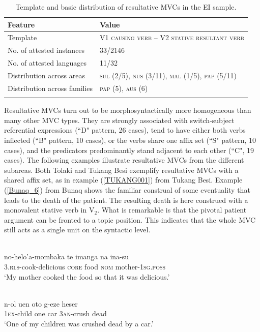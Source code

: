 \begin{table}
\begin{tabular}{ll}
\lsptoprule
Feature&Value\tabularnewline
\hline
Template&V1 \textsc{causing verb} -- V2 \textsc{stative resultant verb}\tabularnewline
No. of attested instances& 33/2146 \tabularnewline
No. of attested languages& 11/32 \tabularnewline
Distribution across areas& \textsc{sul} (2/5), \textsc{nus} (3/11), \textsc{mal} (1/5), \textsc{pap} (5/11) \tabularnewline
Distribution across families& \textsc{pap} (5), \textsc{aus} (6) \tabularnewline
\lspbottomrule
\end{tabular}
\caption[Template and basic distribution of resultative MVCs]{Template and basic distribution of resultative MVCs in the EI sample. }
\label{table:resultative}
\end{table}

Resultative MVCs turn out to be morphosyntactically more homogeneous than many other MVC types. They are strongly associated with switch-subject referential expressions (``D" pattern, 26 cases), tend to have either both verbs inflected (``B" pattern, 10 cases), or the verbs share one affix set (``S" pattern, 10 cases), and the predicators predominantly stand adjacent to each other (``C", 19 cases). The following examples illustrate resultative MVCs from the different subareas. Both Tolaki and Tukang Besi exemplify resultative MVCs with a shared affix set, as in example (\ref{TUKANG001}) from Tukang Besi. Example (\ref{Bunaq_6}) from Bunaq shows the familiar construal of some eventuality that leads to the death of the patient. The resulting death is here construed with a monovalent stative verb in V$_2$. What is remarkable is that the pivotal patient argument can be fronted to a topic position. This indicates that the whole MVC still acts as a single unit on the syntactic level. 

\ea \label{TUKANG001}
\\
\gll no-helo'a-mombaka te imanga na ina-su \\
\textsc{3}.\textsc{rls}-cook-delicious \textsc{core} food \textsc{nom} mother-\textsc{1}\textsc{sg}.\textsc{poss} \\
\glft `My mother cooked the food so that it was delicious.'\\ 
\z

\ea \label{Bunaq_6}
\\
\gll n-ol uen oto g-eze heser \\
1\textsc{ex}-child one car 3\textsc{an}-crush dead \\
\glft `One of my children was crushed dead by a car.’\\ 
\z

